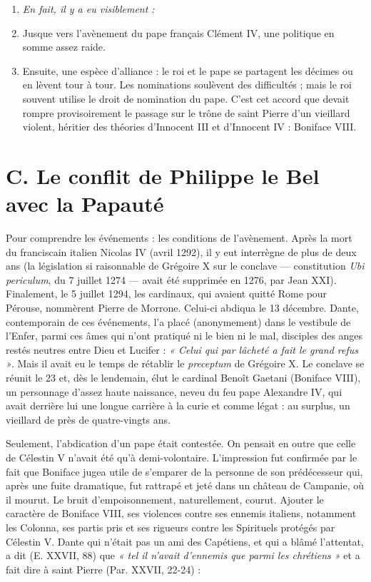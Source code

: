 \documentclass[french,twoside]{book} %
\newlength{\listmod}
\newcommand{\listhead}[1]{\hspace{-1\listmod}\emph{#1}}
\newcommand{\labelchar}[1]{{\color{rubric}\bf #1}}
\begin{document}
\begin{enumerate}[itemsep=0pt,]
\item[]\listhead{En fait, il y a eu visiblement :}
\item Jusque vers l’avènement du pape français Clément IV, une politique en somme assez raide.
\item Ensuite, une espèce d’alliance : le roi et le pape se partagent les décimes ou en lèvent tour à tour. Les nominations soulèvent des difficultés ; mais le roi souvent utilise le droit de nomination du pape. C’est cet accord que devait rompre provisoirement le passage sur le trône de saint Pierre d’un vieillard violent, héritier des théories d’Innocent III et d’Innocent IV : Boniface VIII.

\end{enumerate}\section[C. Le conflit de Philippe le Bel avec la Papauté]{C. Le conflit de Philippe le Bel avec la Papauté \protect\footnotemark}
\label{c06c}
\noindent \labelchar{1)} Pour comprendre les événements : les conditions de l’avènement. Après la mort du franciscain italien Nicolas IV (avril 1292), il y eut interrègne de plus de deux ans (la législation si raisonnable de Grégoire X sur le conclave — constitution {\itshape Ubi periculum}, du 7 juillet 1274 — avait été supprimée en 1276, par Jean XXI).  
\label{p51} Finalement, le 5 juillet 1294, les cardinaux, qui avaient quitté Rome pour Pérouse, nommèrent Pierre de Morrone. Celui-ci abdiqua le 13 décembre. Dante, contemporain de ces événements, l’a placé (anonymement) dans le vestibule de l’Enfer, parmi ces âmes qui n’ont pratiqué ni le bien ni le mal, disciples des anges restés neutres entre Dieu et Lucifer : \emph{« Celui qui par lâcheté a fait le grand refus »}. Mais il avait eu le temps de rétablir le {\itshape preceptum} de Grégoire X. Le conclave se réunit le 23 et, dès le lendemain, élut le cardinal Benoît Gaetani (Boniface VIII), un personnage d’assez haute naissance, neveu du feu pape Alexandre IV, qui avait derrière lui une longue carrière à la curie et comme légat : au surplus, un vieillard de près de quatre-vingts ans.\par
Seulement, l’abdication d’un pape était contestée. On pensait en outre que celle de Célestin V n’avait été qu’à demi-volontaire. L’impression fut confirmée par le fait que Boniface jugea utile de s’emparer de la personne de son prédécesseur qui, après une fuite dramatique, fut rattrapé et jeté dans un château de Campanie, où il mourut. Le bruit d’empoisonnement, naturellement, courut. Ajouter le caractère de Boniface VIII, ses violences contre ses ennemis italiens, notamment les Colonna, ses partis pris et ses rigueurs contre les Spirituels protégés par Célestin V. Dante qui n’était pas un ami des Capétiens, et qui a blâmé l’attentat, a dit (E. XXVII, 88) que \emph{« tel il n’avait d’ennemis que parmi les chrétiens »} et a fait dire à saint Pierre (Par. XXVII, 22-24) :\par
\end{document}
